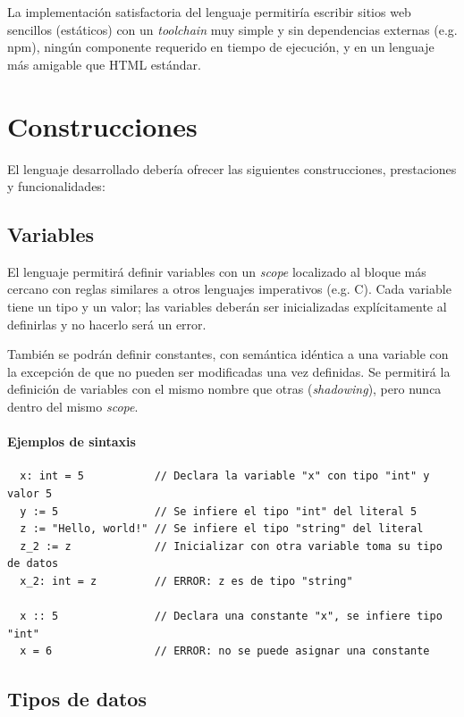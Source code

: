 La implementación satisfactoria del lenguaje permitiría escribir sitios web
sencillos (estáticos) con un \textit{toolchain} muy simple y sin dependencias
externas (e.g. npm), ningún componente requerido en tiempo de ejecución, y en un
lenguaje más amigable que HTML estándar.

\section{Construcciones}

El lenguaje desarrollado debería ofrecer las siguientes construcciones,
prestaciones y funcionalidades:

\subsection{Variables}

El lenguaje permitirá definir variables con un \textit{scope} localizado al
bloque más cercano con reglas similares a otros lenguajes imperativos (e.g. C).
Cada variable tiene un tipo y un valor; las variables deberán ser inicializadas
explícitamente al definirlas y no hacerlo será un error.

También se podrán definir constantes, con semántica idéntica a una variable con
la excepción de que no pueden ser modificadas una vez definidas. Se permitirá la
definición de variables con el mismo nombre que otras (\textit{shadowing}), pero
nunca dentro del mismo \textit{scope}.

\paragraph{Ejemplos de sintaxis}
\small
\begin{verbatim}
  x: int = 5           // Declara la variable "x" con tipo "int" y valor 5
  y := 5               // Se infiere el tipo "int" del literal 5
  z := "Hello, world!" // Se infiere el tipo "string" del literal
  z_2 := z             // Inicializar con otra variable toma su tipo de datos
  x_2: int = z         // ERROR: z es de tipo "string"

  x :: 5               // Declara una constante "x", se infiere tipo "int"
  x = 6                // ERROR: no se puede asignar una constante
\end{verbatim}
\normalsize

\subsection{Tipos de datos}

